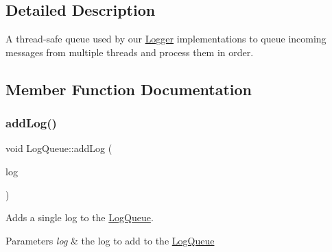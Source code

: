 \subsection{Detailed Description}
A thread-\/safe queue used by our \hyperlink{class_aws_1_1_iot_1_1_device_client_1_1_logging_1_1_logger}{Logger} implementations to queue incoming messages from multiple threads and process them in order. 

\subsection{Member Function Documentation}
\mbox{\label{class_aws_1_1_iot_1_1_device_client_1_1_logging_1_1_log_queue_aaa3cf9fd1a81682f9e9a44bbce487308}} 
\subsubsection{\texorpdfstring{add\+Log()}{addLog()}}
{\footnotesize\ttfamily void Log\+Queue\+::add\+Log (\begin{DoxyParamCaption}\item[{std\+::unique\+\_\+ptr$<$ \hyperlink{class_aws_1_1_iot_1_1_device_client_1_1_logging_1_1_log_message}{Log\+Message} $>$}]{log }\end{DoxyParamCaption})}



Adds a single log to the \hyperlink{class_aws_1_1_iot_1_1_device_client_1_1_logging_1_1_log_queue}{Log\+Queue}. 


\begin{DoxyParams}{Parameters}
{\em log} & the log to add to the \hyperlink{class_aws_1_1_iot_1_1_device_client_1_1_logging_1_1_log_queue}{Log\+Queue} \\
\hline
\end{DoxyParams}
\mbox{\label{class_aws_1_1_iot_1_1_device_client_1_1_logging_1_1_log_queue_a0db76ccf436b508b17d82fccaff63eb4}} 
